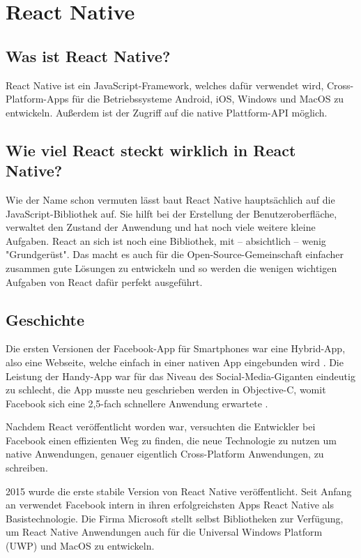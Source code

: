 \section{React Native}
\label{reactnative}

\subsection{Was ist React Native?}
React Native ist ein JavaScript-Framework, welches dafür verwendet wird, Cross-Platform-Apps für
die Betriebssysteme Android, iOS, Windows und MacOS zu entwickeln. Außerdem ist der Zugriff auf die
native Plattform-API möglich.

\subsection{Wie viel React steckt wirklich in React Native?}
Wie der Name schon vermuten lässt baut React Native hauptsächlich auf die JavaScript-Bibliothek
 auf. Sie hilft bei der Erstellung der Benutzeroberfläche, verwaltet den Zustand
der Anwendung und hat noch viele weitere kleine Aufgaben. React an sich ist noch eine Bibliothek,
mit -- absichtlich -- wenig "Grundgerüst". Das macht es auch für die Open-Source-Gemeinschaft
einfacher zusammen gute Lösungen zu entwickeln und so werden die wenigen wichtigen Aufgaben von
React dafür perfekt ausgeführt.

\subsection{Geschichte}
Die ersten Versionen der Facebook-App für Smartphones war eine Hybrid-App, also eine Webseite,
welche einfach in einer nativen App eingebunden wird \cite{reactNativeHistory}. Die Leistung der
Handy-App war für das Niveau des Social-Media-Giganten eindeutig zu schlecht, die App musste neu
geschrieben werden in Objective-C, womit Facebook sich eine 2,5-fach schnellere Anwendung erwartete
\cite{facebookNewIosApp}.

Nachdem React veröffentlicht worden war, versuchten die Entwickler bei Facebook einen effizienten
Weg zu finden, die neue Technologie zu nutzen um native Anwendungen, genauer eigentlich
Cross-Platform Anwendungen, zu schreiben.

2015 wurde die erste stabile Version von React Native veröffentlicht. Seit Anfang an verwendet
Facebook intern in ihren erfolgreichsten Apps React Native als Basistechnologie. Die Firma Microsoft
stellt selbst Bibliotheken zur Verfügung, um React Native Anwendungen auch für die Universal Windows
Platform (UWP) und MacOS zu entwickeln.

